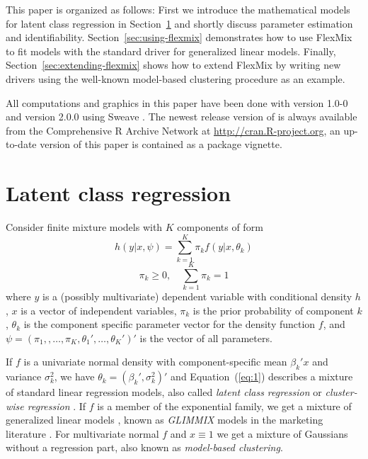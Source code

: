 \documentclass{jss}
\newcommand{\R}{\proglang{R}}
\begin{document}
This paper is organized as follows: First we introduce the
mathematical models for latent class regression in
Section~\ref{sec:latent-class-regr} and shortly discuss parameter
estimation and identifiability.  Section~\ref{sec:using-flexmix}
demonstrates how to use FlexMix to fit models with the standard driver
for generalized linear models. Finally,
Section~\ref{sec:extending-flexmix} shows how to extend FlexMix by
writing new drivers using the well-known model-based clustering
procedure as an example.

All computations and graphics in this paper have been done with
 version 1.0-0 and \R{} version 2.0.0 using Sweave
\citep{e1071-papers:Leisch:2002}. The newest release version of
 is always available from the Comprehensive R Archive
Network at \url{http://cran.R-project.org}, an up-to-date version of
this paper is contained as a package vignette.

\section{Latent class regression}
\label{sec:latent-class-regr}


Consider finite mixture models with $K$ components of form
\begin{equation}\label{eq:1}
  h(y|x,\psi) = \sum_{k = 1}^K \pi_k
  f(y|x,\theta_k) 
\end{equation}
\begin{displaymath}
  \pi_k \geq 0, \quad
  \sum_{k = 1}^K \pi_k = 1
\end{displaymath}
where $y$ is a (possibly multivariate) dependent variable with
conditional density $h$, $x$ is a vector of independent variables,
$\pi_k$ is the prior probability of component $k$, $\theta_k$ is the
component specific parameter vector for the density function $f$, and
$\psi=(\pi_1,,\ldots,\pi_K,\theta_1',\ldots,\theta_K')'$ is the vector of
all parameters.

If $f$ is a univariate normal density with component-specific mean
$\beta_k'x$ and variance $\sigma^2_k$, we have $\theta_k = (\beta_k',
\sigma_k^2)'$ and Equation~(\ref{eq:1}) describes a mixture of
standard linear regression models, also called \emph{latent class
  regression} or \emph{cluster-wise regression}
\citep{flm:DeSarbo+Cron:1988}.  If $f$ is a member of the exponential
family, we get a mixture of generalized linear models
\citep{flm:Wedel+DeSarbo:1995}, known as \emph{GLIMMIX} models in the
marketing literature \citep{flb:Wedel+Kamakura:2001}.  For
multivariate normal $f$ and $x\equiv1$ we get a mixture of Gaussians
without a regression part, also known as \emph{model-based
  clustering}.
\end{document}
